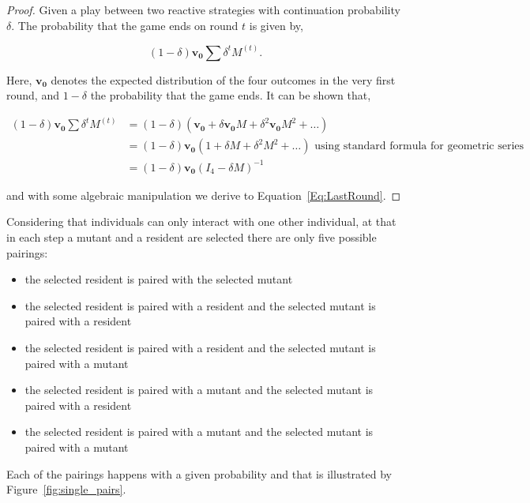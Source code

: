 \documentclass[11pt]{article}
\theoremstyle{plainCl1}
\theoremstyle{plainCl2}
\begin{document}
\begin{proof}
Given a play between two reactive strategies with continuation probability
$\delta$. The probability that the game ends on round \(t\) is given by,

\begin{equation}\label{eq:}
  (1 - \delta) \mathbf{v_0} \sum \delta^{t} M^{(t)}.
\end{equation}

Here, $\mathbf{v_0}$ denotes the expected distribution of the four outcomes in
the very first round, and \(1- \delta\) the probability that the game ends.
It can be shown that,

\begin{align*}
  (1 - \delta) \mathbf{v_0} \sum \delta^{t} M^{(t)} & = (1 - \delta)(\mathbf{v_0} + \delta \mathbf{v_0} M + \delta^{2}\mathbf{v_0} M ^{2} + \dots )\\ 
   & = (1 - \delta)\mathbf{v_0} (1 + \delta M + \delta^{2}M ^{2} + \dots ) \text{ using standard formula for geometric series}\\ 
   & = (1 - \delta)\mathbf{v_0}(I_4 - \delta M)^{-1}
\end{align*}

and with some algebraic manipulation we derive to Equation~\ref{Eq:LastRound}.
\end{proof}

Considering that individuals can only interact with one other individual,
at that in each step a mutant and a resident are selected there are only five
possible pairings:

\begin{itemize}
  \item the selected resident is paired with the selected mutant
  \item the selected resident is paired with a resident and the selected mutant is paired with a resident
  \item the selected resident is paired with a resident and the selected mutant is paired with a mutant
  \item the selected resident is paired with a mutant and the selected mutant is paired with a resident
  \item the selected resident is paired with a mutant and the selected mutant is paired with a mutant
\end{itemize}

Each of the pairings happens with a given probability and that is illustrated
by Figure~\ref{fig:single_pairs}.
\end{document}
